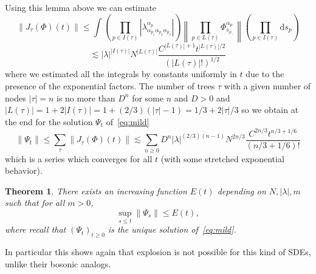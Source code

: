 \documentclass{article}
\newcommand{\mathd}{\mathrm{d}}
\newtheorem{theorem}{Theorem}
\begin{document}
Using this lemma above we can estimate
\[ \| J_{\tau} (\Phi) (t) \| \leqslant \int \left( \prod_{p \in I (\tau)}
   \left| \lambda^{\alpha_p}_{\alpha_{p_1} \alpha_{p_2} \alpha_{p_3}} \right|
   \right) \left\| \prod_{p \in L (\tau)} \Phi^{\alpha_p}_{s_{p_-}} \right\|
   \left( \prod_{p \in I (\tau)} \mathd s_p \right) \]
\[ \lesssim | \lambda |^{| I (\tau) |} N^{| L (\tau) |} \frac{C^{| L (\tau) |
   + 1} t^{| L (\tau) | / 2}}{(| L (\tau) | !)^{1 / 2}} \]
where we estimated all the integrals by constants uniformly in $t$ due to the
presence of the exponential factors. The number of trees $\tau$ with a given
number of nodes $| \tau | = n$ is no more than $D^n$ for some $n$ and $D > 0$
and $| L (\tau) | = 1 + 2 | I (\tau) | = 1 + (2 / 3) (| \tau | - 1) = 1 / 3 +
2 | \tau | / 3$ so we obtain at the end for the solution $\Psi_t$
of~{\eqref{eq:mild}}
\begin{equation}
  \| \Psi_t \| \leqslant \sum_{\tau} \| J_{\tau} (\Phi) (t) \| \lesssim
  \sum_{n \geqslant 0} D^n | \lambda |^{(2 / 3) (n - 1)} N^{2 n / 3}
  \frac{C^{2 n / 3} t^{n / 3 + 1 / 6}}{(n / 3 + 1 / 6) !}
  \label{eq:estimateexpansion}
\end{equation}
which is a series which converges for all $t$ (with some stretched exponential
behavior).

\begin{theorem}
  There exists an increasing function $E (t)$ depending on $N, | \lambda |, m$
  such that for all $m > 0$,
  \[ \sup_{s \leqslant t} \| \Psi_s \| \leqslant E (t), \]
  where recall that $(\Psi_t)_{t \geqslant 0}$ is the unique solution
  of~{\eqref{eq:mild}}.
\end{theorem}

In particular this shows again that explosion is not possible for this kind of
SDEs, unlike their bosonic analogs.

\
\end{document}
